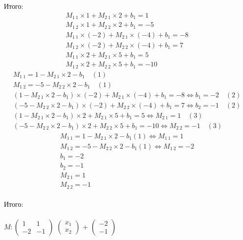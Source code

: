 \begin{enumerate}
			Итого:
			\begin{gather*}
				M_{1 \ 1} \times 1 + M_{2 \ 1} \times 2 + b_1 = 1 \\
				M_{1 \ 2} \times 1 + M_{2 \ 2} \times 2 + b_1 = -5 \\
				M_{1 \ 1} \times (-2) + M_{2 \ 1} \times (-4) + b_1 = -8 \\
				M_{1 \ 2} \times (-2) + M_{2 \ 2} \times (-4) + b_1 = 7 \\
				M_{1 \ 1} \times 2 + M_{2 \ 1} \times 5 + b_1 = 5 \\
				M_{1 \ 2} \times 2 + M_{2 \ 2} \times 5 + b_1 = -10
			\end{gather*}
			\begin{gather*}
				M_{1 \ 1} = 1 - M_{2 \ 1} \times 2 - b_1 \quad (1) \\
				M_{1 \ 2} = -5 - M_{2 \ 2} \times 2 - b_1 \quad (1) \\
				(1 - M_{2 \ 1} \times 2 - b_1) \times (-2) + M_{2 \ 1} \times (-4) + b_1 = -8 \Longleftrightarrow b_1 = -2 \quad (2) \\
				(-5 - M_{2 \ 2} \times 2 - b_1) \times (-2) + M_{2 \ 2} \times (-4) + b_1 = 7 \Longleftrightarrow b_2 = -1 \quad (2) \\
				(1 - M_{2 \ 1} \times 2 - b_1) \times 2 + M_{2 \ 1} \times 5 + b_1 = 5 \Longleftrightarrow M_{2 \ 1} = 1 \quad (3) \\
				(-5 - M_{2 \ 2} \times 2 - b_1) \times 2 + M_{2 \ 2} \times 5 + b_1 = -10 \Longleftrightarrow M_{2 \ 2} = -1 \quad (3)
			\end{gather*}
			\begin{gather*}
				M_{1 \ 1} = 1 - M_{2 \ 1} \times 2 - b_1 (1) \Longleftrightarrow M_{1 \ 1} = 1 \\
				M_{1 \ 2} = -5 - M_{2 \ 2} \times 2 - b_1 (1) \Longleftrightarrow M_{1 \ 2} = -2\\
				b_1 = -2 \\
				b_2 = -1 \\
				M_{2 \ 1} = 1 \\
				M_{2 \ 2} = -1
			\end{gather*} \\
			
			Итого: \\ \\
			$M : \left( \begin{array}{cc}
			1 & 1 \\
			-2 & -1
			\end{array} \right)$
			$\left( \begin{array}{c}
			x_1 \\
			x_2
			\end{array} \right)$ $+$
			$\left( \begin{array}{c}
			-2 \\
			-1
			\end{array} \right)$ \\ \\
			

\end{enumerate}
